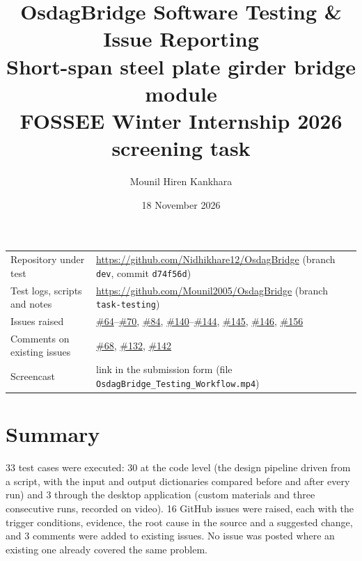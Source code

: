\documentclass[10pt,a4paper]{article}
\title{\textbf{OsdagBridge Software Testing \& Issue Reporting}\\[4pt]
\large Short-span steel plate girder bridge module\\[2pt]
\normalsize FOSSEE Winter Internship 2026 screening task}
\author{Mounil Hiren Kankhara}
\date{18 November 2026}
\newcommand{\gh}[1]{\href{https://github.com/Nidhikhare12/OsdagBridge/issues/#1}{\##1}}
\newcommand{\issPF}{\gh{145}}   %
\newcommand{\issCS}{\gh{146}}   %
\newcommand{\issBL}{\gh{156}}   %
\begin{document}
\maketitle

\begin{center}
\begin{tabular}{@{}ll@{}}
Repository under test & \url{https://github.com/Nidhikhare12/OsdagBridge} (branch \texttt{dev}, commit \texttt{d74f56d})\\
Test logs, scripts and notes & \url{https://github.com/Mounil2005/OsdagBridge} (branch \texttt{task-testing})\\
Issues raised & \gh{64}--\gh{70}, \gh{84}, \gh{140}--\gh{144}, \issPF, \issCS, \issBL\\
Comments on existing issues & \gh{68}, \gh{132}, \gh{142}\\
Screencast & link in the submission form (file \texttt{OsdagBridge\_Testing\_Workflow.mp4})
\end{tabular}
\end{center}

\section*{Summary}
33 test cases were executed: 30 at the code level (the design pipeline driven from a script, with the input and output dictionaries compared before and after every run) and 3 through the desktop application (custom materials and three consecutive runs, recorded on video). 16 GitHub issues were raised, each with the trigger conditions, evidence, the root cause in the source and a suggested change, and 3 comments were added to existing issues. No issue was posted where an existing one already covered the same problem.
\end{document}
